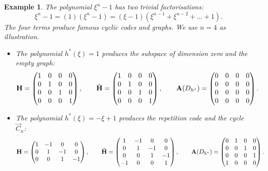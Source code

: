 \documentclass[a4paper, 11pt]{book}
\numberwithin{equation}{section}
\theoremstyle{plain}
\newtheorem{example}	[equation]	{Example}
\newcommand{\adjacency}{{\bf A}}
\renewcommand{\(}{\ldbrack}
\renewcommand{\)}{\rdbrack}
\begin{document}
\begin{example} \label{ex:trivial_cyclic_graphs}
The polynomial $\xi^n - 1$ has two trivial factorisations:
\[
	\xi^n - 1 = (1)(\xi^n-1) = (\xi-1)(\xi^{n-1} + \xi^{n-2} + \dots + 1).
\]
The four terms produce famous cyclic codes and graphs. We use $n = 4$ as illustration.
\begin{itemize}
    \item The polynomial $h^*(\xi) = 1$ produces the subspace of dimension zero and the empty graph:
	\[
		{\bf H} = \begin{pmatrix}
		1 & 0 & 0 & 0\\
		0 & 1 & 0 & 0\\
		0 & 0 & 1 & 0\\
		0 & 0 & 0 & 1
		\end{pmatrix}, \qquad
		\hat{\bf H} = \begin{pmatrix}
		1 & 0 & 0 & 0\\
		0 & 1 & 0 & 0\\
		0 & 0 & 1 & 0\\
		0 & 0 & 0 & 1
		\end{pmatrix}, \qquad
		\adjacency(D_{h^*}) = \begin{pmatrix}
		0 & 0 & 0 & 0\\
		0 & 0 & 0 & 0\\
		0 & 0 & 0 & 0\\
		0 & 0 & 0 & 0
		\end{pmatrix}.
	\]

    \item The polynomial $h^*(\xi) = -\xi + 1$ produces the repetition code and the cycle $\vec{C}_n$:
	\[
		{\bf H} = \begin{pmatrix}
		1 & -1 & 0 & 0\\
		0 & 1 & -1 & 0\\
		0 & 0 & 1 & -1
		\end{pmatrix}, \qquad
		\hat{\bf H} = \begin{pmatrix}
		1 & -1 & 0 & 0\\
		0 & 1 & -1 & 0\\
		0 & 0 & 1 & -1\\
		-1 & 0 & 0 & 1
		\end{pmatrix}, \qquad
		\adjacency(D_{h^*}) = \begin{pmatrix}
		0 & 1 & 0 & 0\\
		0 & 0 & 1 & 0\\
		0 & 0 & 0 & 1\\
		1 & 0 & 0 & 0
		\end{pmatrix}.
	\]


\end{itemize}
\end{example}
\end{document}
